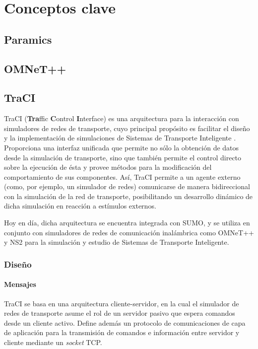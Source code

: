 \chapter{Conceptos clave}

\section{Paramics}
\section{OMNeT++}
\section{TraCI}
TraCI (\textbf{Tra}ffic \textbf{C}ontrol \textbf{I}nterface) es una arquitectura para la interacción con simuladores de redes de transporte, cuyo principal propósito es facilitar el diseño y la implementación de simulaciones de Sistemas de Transporte Inteligente \cite{traci}. Proporciona una interfaz unificada que permite no sólo la obtención de datos desde la simulación de transporte, sino que también permite el control directo sobre la ejecución de ésta y provee métodos para la modificación del comportamiento de sus componentes. Así, TraCI permite a un agente externo (como, por ejemplo, un simulador de redes) comunicarse de manera bidireccional con la simulación de la red de transporte, posibilitando un desarrollo dinámico de dicha simulación en reacción a estímulos externos.

Hoy en día, dicha arquitectura se encuentra integrada con SUMO, y se utiliza en conjunto con simuladores de redes de comunicación inalámbrica como OMNeT++ y NS2 para la simulación y estudio de Sistemas de Transporte Inteligente.

\subsection{Diseño}
\subsubsection{Mensajes}

TraCI se basa en una arquitectura cliente-servidor, en la cual el simulador de redes de transporte asume el rol de un servidor pasivo que espera comandos desde un cliente activo. Define además un protocolo de comunicaciones de capa de aplicación para la transmisión de comandos e información entre servidor y cliente mediante un \emph{socket} TCP.

